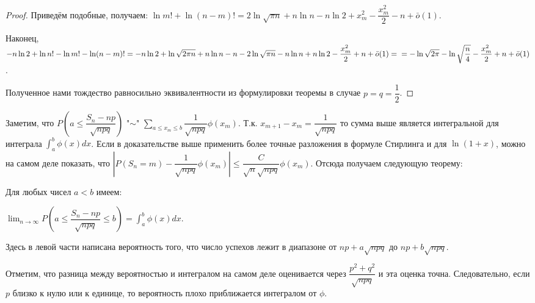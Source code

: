 \documentclass[a4paper]{article}
\begin{document}
\begin{colloq}
\begin{proof}
		Приведём подобные, получаем: $\ln m! + \ln (n-m)! = 2 \ln \sqrt{\pi n} + n \ln n - n \ln 2 + x_m^2 - \dfrac{x_m^2}{2} - n + \bar o (1)$.
		
		Наконец, $-n \ln 2 + \ln n! - \ln m! - \ln (n-m)! = -n \ln 2 + \ln \sqrt{2 \pi n} + n \ln n - n - 2 \ln \sqrt{\pi n} - n \ln n + n \ln 2 - \dfrac{x_m^2}{2} + n + \bar o (1) = \\ = - \ln \sqrt{2 \pi} - \ln \sqrt{\dfrac{n}{4}} - \dfrac{x_m^2}{2} + n + \bar o (1)$.
		
		Полученное нами тождество равносильно эквивалентности из формулировки теоремы в случае $p = q = \dfrac{1}{2}$.
	\end{proof}

	Заметим, что $P \left(a \leqslant \dfrac{S_n - np}{\sqrt{npq}} \right)$ "$\sim$" $\sum_{a \leqslant x_m \leqslant b} \dfrac{1}{\sqrt{npq}}\phi(x_m)$. Т.к. $x_{m+1} - x_m = \dfrac{1}{\sqrt{npq}}$ то сумма выше является интегральной для интеграла $\int_a^b \phi(x) dx$. Если в доказательстве выше применить более точные разложения в формуле Стирлинга и для $\ln (1 + x)$, можно на самом деле показать, что $\left|P(S_n = m) - \dfrac{1}{\sqrt{npq}} \phi(x_m) \right| \leqslant \dfrac{C}{\sqrt{n}\sqrt{npq}} \phi(x_m)$. Отсюда получаем следующую теорему:
	
	\begin{theorem}
		Для любых чисел $a < b$ имеем:
		
		$\lim_{n \rightarrow \infty} P\left( a \leqslant \dfrac{S_n - np}{\sqrt{npq}} \leqslant b \right) = \int_a^b \phi(x) dx$.
		
		Здесь в левой части написана вероятность того, что число успехов лежит в диапазоне от $np + a\sqrt{npq}$ до $np + b\sqrt{npq}$.
	\end{theorem}

	Отметим, что разница между вероятностью и интегралом на самом деле оценивается через $\dfrac{p^2 + q^2}{\sqrt{npq}}$ и эта оценка точна. Следовательно, если $p$ близко к нулю или к единице, то	вероятность плохо приближается интегралом от $\phi$.

    \end{colloq}
\end{document}
